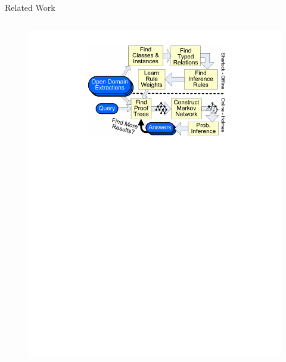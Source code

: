 \documentclass[onlymath,xcolor=pdftex,dvipsnames,table]{beamer}
\begin{document}
\begin{frame}{Related Work}
\begin{columns}[c]
  \begin{figure}
    \centering
    \includegraphics[clip,trim=125pt 500pt 125pt 30pt,width=\linewidth]{sherlock.pdf}
  \end{figure}
\end{columns}
\end{frame}
\end{document}
